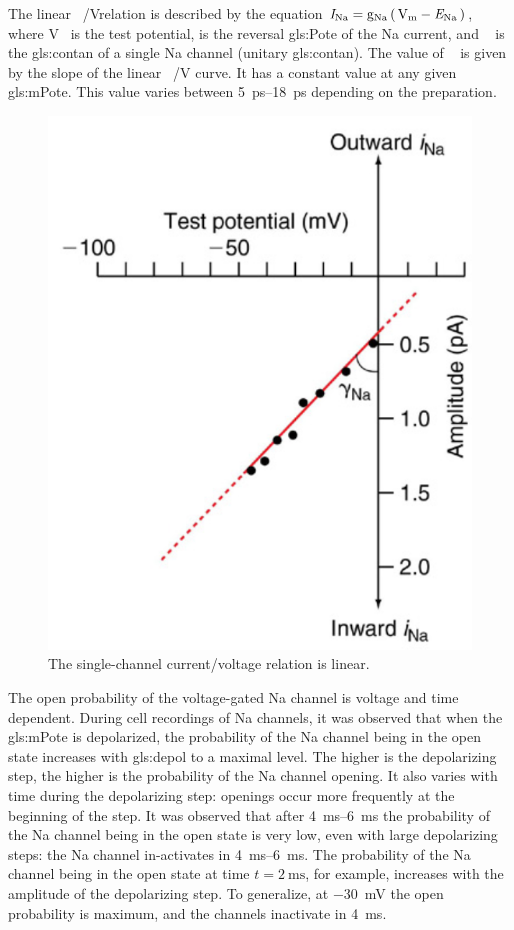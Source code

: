 \documentclass[class={myRUCProject}, crop=false]{standalone}
\begin{document}
The linear \unit[per-mode = symbol]{\cur\sodium\per\V}relation is described by the equation \(\unit{\cur\sodium} = \unit{\con\sodium} \br{\unit{\V\membrane}-\equilibria\sodium}\), where \unit{\V\membrane} is the test potential, \equilibria\sodium is the reversal \gls{gls:Pote} of the \gls{Na} current, and \unit{\con\sodium} is the \gls{gls:contan} of a single \gls{Na} channel (unitary \gls{gls:contan}). The value of \unit{\con\sodium} is given by the slope of the linear \unit[per-mode = symbol]{\cur\sodium\per\V} curve. It has a constant value at any given \gls{gls:mPote}. This value varies between \qtyrange{5}{18}{\pico\second} depending on the preparation.

\begin{figure}[H]
    \centering
    \includegraphics[width=0.5\linewidth]{Pictures//Anakin/iNa-VNa.png}
    \caption{The single-channel current/voltage \br{\unit[per-mode = symbol]{\cur\sodium\per\volt}} relation is linear. }
    \label{fig:NaVNa}
\end{figure}
The open probability of the voltage-gated \gls{Na} channel is voltage and time dependent. During cell recordings of \gls{Na} channels, it was observed that when the \gls{gls:mPote} is depolarized, the probability of the \gls{Na} channel being in the open state increases with \gls{gls:depol} to a maximal level. The higher is the depolarizing step, the higher is the probability of the \gls{Na} channel opening. It also varies with time during the depolarizing step: openings occur more frequently at the beginning of the step. It was observed  that after \qtyrange{4}{6}{\ms} the probability of the \gls{Na} channel being in the open state is very low, even with large depolarizing steps: the \gls{Na} channel in-activates in \qtyrange{4}{6}{\ms}.  The probability of the \gls{Na} channel being in the open state at time \(t=\qty{2}{\ms}\), for example, increases with the amplitude of the depolarizing step. To generalize, at \qty{-30}{\mV} the open probability is maximum, and the channels inactivate in \qty{4}{\ms}. 
\end{document}
